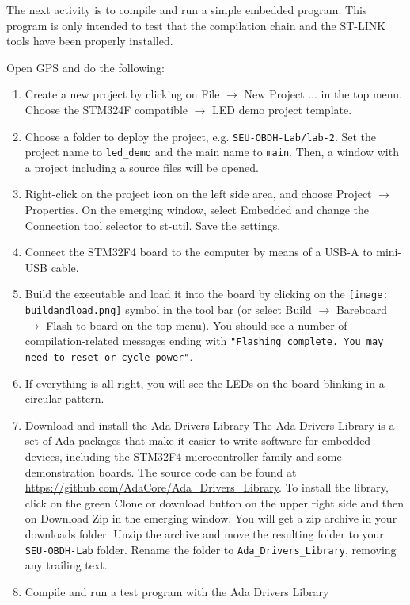 The next activity is to compile and run a simple embedded program.
This program is only intended to test that the compilation chain
and the ST-LINK tools have been properly installed.

Open GPS and do the following:
\begin{enumerate}
\item Create a new project by clicking on File $\rightarrow$ New Project ... in the top menu. Choose the STM324F compatible $\rightarrow$ LED demo project template.

\item	Choose a folder to deploy the project, e.g. \textcolor{mPurple}{\texttt{SEU-OBDH-Lab/lab-2}}.
Set the project name to \texttt{led\_demo} and the main name to \texttt{main}.
Then, a window with a project including a source files will be opened.

\item	Right-click on the project icon on the left side area,
and choose Project $\rightarrow$ Properties.
On the emerging window,
select Embedded and change the Connection tool selector to st-util.
Save the settings.

\item	Connect the STM32F4 board to the computer by means of a USB-A to mini-USB cable.

\item	Build the executable and load it into the board by clicking on the
\hbox{\texttt{[image: buildandload.png]}} symbol in the tool bar (or select Build $\rightarrow$ Bareboard $\rightarrow$ Flash to board on the top menu). You should see a number of compilation-related messages ending with \texttt{"Flashing complete. You may need to reset or cycle power"}.

\item	If everything is all right, you will see the LEDs on the board blinking in a circular pattern.

\item Download and install the Ada Drivers Library
The Ada Drivers Library is a set of Ada packages that make it easier to write software for embedded devices, including the STM32F4 microcontroller family and some demonstration boards. The source code can be found at \url{https://github.com/AdaCore/Ada\_Drivers\_Library}. To install the library, click on the green Clone or download button on the upper right side and then on Download Zip in the emerging window. You will get a zip archive in your downloads folder. Unzip the archive and move the resulting folder to your \texttt{SEU-OBDH-Lab} folder. Rename the folder to \textcolor{mPurple}{\texttt{Ada\_Drivers\_Library}}, removing any trailing text.

\item Compile and run a test program with the Ada Drivers Library
\end{enumerate}
